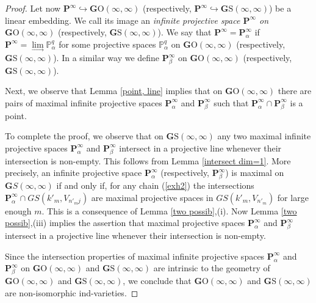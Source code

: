 \documentclass[12pt]{amsart}
\theoremstyle{definition}
\begin{document}
\begin{proof}
Let now $\mathbf{P}^{\infty}\hookrightarrow\mathbf{G}\mathrm{O}(\infty,\infty)$ (respectively,
$\mathbf{P}^{\infty}\hookrightarrow\mathbf{G}\mathrm{S}(\infty,\infty)$) be a linear embedding. We call its image an
\textit{infinite projective space $\mathbf{P}^{\infty}$ on} $\mathbf{G}\mathrm{O}(\infty,\infty)$ (respectively,
$\mathbf{G}\mathrm{S}(\infty,\infty)$). We say that $\mathbf{P}^{\infty}=\mathbf{P}^{\infty}_{\alpha}$ if
$\mathbf{P}^{\infty}=\underset{\to}\lim\mathbb{P}^q_{\alpha}$ for some projective spaces $\mathbb{P}^q_{\alpha}$ on
$\mathbf{G}\mathrm{O}(\infty,\infty)$ (respectively, $\mathbf{G}\mathrm{S}(\infty,\infty)$). In a similar way we define
$\mathbf{P}^{\infty}_{\beta}$ on $\mathbf{G}\mathrm{O}(\infty,\infty)$ (respectively,
$\mathbf{G}\mathrm{S}(\infty,\infty)$).

Next, we observe that Lemma \ref{point, line} implies that on $\mathbf{G}\mathrm{O}(\infty,\infty)$ there are pairs of
maximal infinite projective spaces $\mathbf{P}^{\infty}_{\alpha}$ and $\mathbf{P}^{\infty}_{\beta}$ such that
$\mathbf{P}^{\infty}_{\alpha}\cap\mathbf{P}^{\infty}_{\beta}$ is a point.

To complete the proof, we observe that on $\mathbf{G}\mathrm{S}(\infty,\infty)$ any two maximal infinite projective
spaces $\mathbf{P}^{\infty}_{\alpha}$ and $\mathbf{P}^{\infty}_{\beta}$ intersect in a projective line whenever their
intersection is non-empty. This follows from Lemma \ref{intersect dim=1}. More precisely, an infinite projective space
$\mathbf{P}^{\infty}_{\alpha}$ (respectively, $\mathbf{P}^{\infty}_{\beta}$) is maximal on $\mathbf{G}S(\infty,\infty)$
if and only if, for any chain (\ref{exh2}) the intersections
$\mathbf{P}^{\infty}_{\alpha}\cap GS(k'_m,V_{n'_mj})$ are maximal projective spaces in $GS(k'_m,V_{n'_m})$ for large
enough $m$. This is a consequence of Lemma \ref{two possib},(i). Now Lemma \ref{two possib},(iii) implies the assertion
that maximal projective spaces $\mathbf{P}^{\infty}_{\alpha}$ and $\mathbf{P}^{\infty}_{\beta}$ intersect in a
projective line whenever their intersection is non-empty.

Since the intersection properties of maximal infinite projective spaces $\mathbf{P}^{\infty}_{\alpha}$ and
$\mathbf{P}^{\infty}_{\beta}$ on $\mathbf{G}\mathrm{O}(\infty,\infty)$ and $\mathbf{G}\mathrm{S}(\infty,\infty)$
are intrinsic to the geometry of $\mathbf{G}\mathrm{O}(\infty,\infty)$ and $\mathbf{G}\mathrm{S}(\infty,\infty)$, we
conclude that $\mathbf{G}\mathrm{O}(\infty,\infty)$ and $\mathbf{G}\mathrm{S}(\infty,\infty)$ are non-isomorphic
ind-varieties.


\end{proof}
\end{document}
